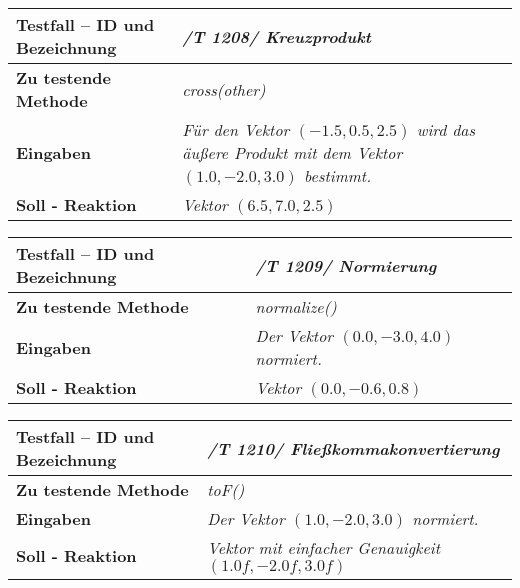 \begin{longtable}{|p{7cm}|p{10cm}|}
\hline
\textbf{Testfall -- ID und Bezeichnung} & \textit{ /T 1208/ Kreuzprodukt} \\
\hline
\textbf{Zu testende Methode} &  \textit{cross(other)} \\
\hline
\textbf{Eingaben} & \textit{Für den Vektor  $(-1.5, 0.5, 2.5)$ wird das äußere Produkt
mit dem Vektor $(1.0, -2.0, 3.0)$ bestimmt.}\\
\hline
\textbf{Soll - Reaktion} & \textit{Vektor $(6.5, 7.0, 2.5)$} \\
\hline
\end{longtable}

\begin{longtable}{|p{7cm}|p{10cm}|}
\hline
\textbf{Testfall -- ID und Bezeichnung} & \textit{ /T 1209/ Normierung} \\
\hline
\textbf{Zu testende Methode} &  \textit{normalize()} \\
\hline
\textbf{Eingaben} & \textit{Der Vektor  $(0.0, -3.0, 4.0)$ normiert.}\\
\hline
\textbf{Soll - Reaktion} & \textit{Vektor $(0.0, -0.6, 0.8)$} \\
\hline
\end{longtable}

\begin{longtable}{|p{7cm}|p{10cm}|}
\hline
\textbf{Testfall -- ID und Bezeichnung} & \textit{ /T 1210/ Fließkommakonvertierung} \\
\hline
\textbf{Zu testende Methode} &  \textit{toF()} \\
\hline
\textbf{Eingaben} & \textit{Der Vektor $(1.0,-2.0, 3.0)$ normiert.}\\
\hline
\textbf{Soll - Reaktion} & \textit{Vektor mit einfacher Genauigkeit $(1.0f, -2.0f, 3.0f)$} \\
\hline
\end{longtable}

